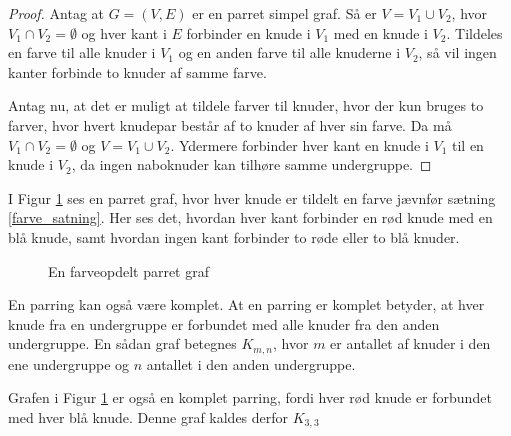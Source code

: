 \begin{proof}
	Antag at $G=(V,E)$ er en parret simpel graf. Så er $V=V_1 \cup V_2$, hvor $V_1 \cap V_2 = \emptyset$ og hver kant i $E$ forbinder en knude i $V_1$ med en knude i $V_2$. 
	Tildeles en farve til alle knuder i $V_1$ og en anden farve til alle knuderne i $V_2$, så vil ingen kanter forbinde to knuder af samme farve. 

	Antag nu, at det er muligt at tildele farver til knuder, hvor der kun bruges to farver, hvor hvert knudepar består af to knuder af hver sin farve.
	Da må $V_1 \cap V_2= \emptyset$ og $V=V_1 \cup V_2$.
	Ydermere forbinder hver kant en knude i $V_1$ til en knude i $V_2$, da ingen naboknuder kan tilhøre samme undergruppe. 
\end{proof}

\begin{exmp}
	I Figur \ref{farve_graf} ses en parret graf, hvor hver knude er tildelt en farve jævnfør sætning \ref{farve_satning}. 
	Her ses det, hvordan hver kant forbinder en rød knude med en blå knude, samt hvordan ingen kant forbinder to røde eller to blå knuder.
	
	\begin{figure}[h!]
		\centering
		
		\caption{En farveopdelt parret graf}\label{farve_graf}
	\end{figure}
\end{exmp}

En parring kan også være komplet. 
At en parring er komplet betyder, at hver knude fra en undergruppe er forbundet med alle knuder fra den anden undergruppe. 
En sådan graf betegnes $K_{m,n}$, hvor $m$ er antallet af knuder i den ene undergruppe og $n$ antallet i den anden undergruppe. 

\begin{exmp}
	Grafen i Figur \ref{farve_graf} er også en komplet parring, fordi hver rød knude er forbundet med hver blå knude. 
Denne graf kaldes derfor $K_{3,3}$
\end{exmp}
